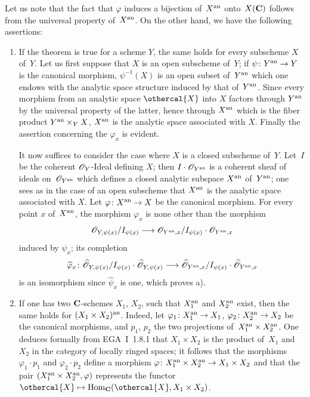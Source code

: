 Let us note that the fact that $\varphi$ induces a bijection of~$X^{\mathrm{an}}$ onto~$X(\mathbf{C})$ follows from the universal property of~$X^{\mathrm{an}}$.
On the other hand, we have the following assertions:

\begin{enumerate}
\item [a)] If the theorem is true for a scheme $Y$, the same
holds for every subscheme $X$ of~$Y$. Let us first suppose
that $X$ is an open subscheme of~$Y$; if $\psi\colon
Y^\an\to Y$ is the canonical morphism, $\psi^{-1}(X)$ is an open subset
of~$Y^{\mathrm{an}}$ which one endows with the analytic space structure induced
by that of~$Y^{\mathrm{an}}$. Since every morphism from an analytic space
$\othercal{X}$ into $X$ factors through $Y^{\mathrm{an}}$ by the
universal property of the latter, hence through
$X^{\mathrm{an}}$ which is the fiber product $Y^{\mathrm{an}}\times_Y X$, $X^{\mathrm{an}}$ is
the analytic space associated with $X$. Finally the assertion
concerning the $\varphi_x$ is evident.

It now suffices to consider the case where $X$ is a
closed subscheme of~$Y$. Let~$I$ be the coherent $\cal{O}_Y$-Ideal
defining $X$; then $I\cdot\cal{O}_{Y^\an}$ is a
coherent sheaf of ideals on~$\cal{O}_{Y^\an}$ which
defines a closed analytic subspace $X^{\mathrm{an}}$ of~$Y^{\mathrm{an}}$; one
sees as in the case of an open subscheme that $X^{\mathrm{an}}$ is
the analytic space associated with $X$. Let $\varphi\colon
X^\an\to X$ be the canonical morphism. For every point $x$ of~$X^{\mathrm{an}}$, the
morphism $\varphi_x$ is none other than the morphism
$$
\cal{O}_{Y,\psi(x)}/I_{\psi(x)}\to
\cal{O}_{Y^\an,x}/I_{\psi(x)}\cdot\cal{O}_{Y^\an,x}
$$
induced by $\psi_x$; its completion
$$
\widehat{\varphi}_x\colon
\widehat{\cal{O}}_{Y,\psi(x)}/I_{\psi(x)}\cdot\widehat{\cal{O}}_{Y,\psi(x)}
\to\widehat{\cal{O}}_{Y^\an,x}/I_{\psi(x)}\cdot\widehat{\cal{O}}_{Y^\an,x}
$$
is an isomorphism since $\widehat\psi_x$ is one, which
proves a).

\item [b)] If one has two $\mathbf{C}$-schemes $X_1$, $X_2$, such that
$X_1^{\mathrm{an}}$ and $X_2^{\mathrm{an}}$ exist, then the same holds for
$(X_1\times X_2)^{\mathrm{an}}$. Indeed, let $\varphi_1\colon X_1^\an\to
X_1$, $\varphi_2\colon X_2^\an\to X_2$ be the canonical morphisms, and
$p_1$, $p_2$ the two projections of~$X_1^{\mathrm{an}}\times X_2^{\mathrm{an}}$. One
deduces formally from EGA~I~1.8.1 that $X_1\times X_2$ is the
product of~$X_1$ and $X_2$ in the category of locally ringed
spaces; it follows that the morphisms
$\varphi_1\cdot p_1$ and $\varphi_2\cdot p_2$ define a
morphism $\varphi\colon X_1^\an\times X_2^\an\to X_1\times X_2$ and
that the pair $(X_1^{\mathrm{an}}\times X_2^{\mathrm{an}},\varphi)$ represents the
functor $\othercal{X}\mto\Hom_\CC(\othercal{X},X_1\times X_2)$.


\end{enumerate}
